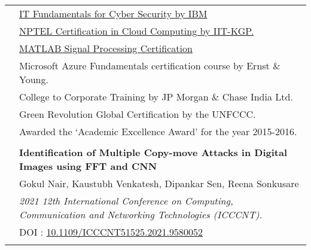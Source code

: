 \documentclass[letterpaper, 10pt]{article}
\begin{document}
\begin{longtable}{p{1.3in}p{4.8in}}

 \\


{\color{OliveGreen}{Awards and}} 
& \href{https://coursera.org/share/873ac303647846970ff59ac138eee553}{IT Fundamentals for Cyber Security by IBM}
{\color{OliveGreen}{Certifications}} \\
& \href{https://nptel.ac.in/noc/Ecertificate/?q=NPTEL21CS62S1402067303147628}{NPTEL Certification in Cloud Computing by IIT-KGP.}\\
& \href{https://matlabacademy.mathworks.com/progress/share/certificate.html?id=2f3a4d83-7d6f-4456-bf49-4e7eb7835edc}{MATLAB Signal Processing Certification} \\
& Microsoft Azure Fundamentals certification course by Ernst \& Young.\\
& College to Corporate Training by JP Morgan \& Chase India Ltd. \\
& Green Revolution Global Certification by the UNFCCC.\\
& Awarded the ‘Academic Excellence Award’ for the year 2015-2016. \\
& \\

\nohyphens{\color{OliveGreen}{Projects \& Publications}} 
& \textbf{Identification of Multiple Copy-move Attacks in Digital Images using FFT and CNN} \\
& Gokul Nair, Kaustubh Venkatesh, Dipankar Sen, Reena Sonkusare \\
& \textit{2021 12th International Conference on Computing, Communication and Networking Technologies (ICCCNT).} \\
& DOI : \href{https://ieeexplore.ieee.org/document/9580052}{10.1109/ICCCNT51525.2021.9580052} \\
& \\



\end{longtable}
\end{document}
